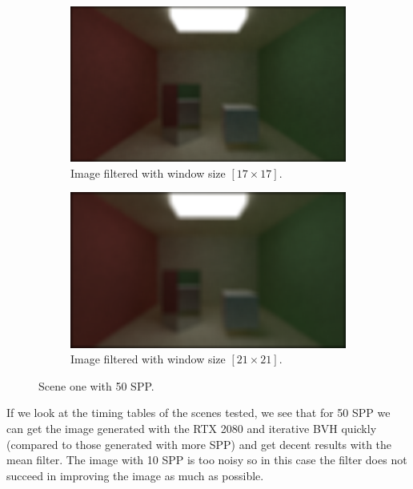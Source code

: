 \documentclass[titlepage,12pt]{report}
\begin{document}
\begin{figure}[H]
	\begin{subfigure}{.48\textwidth}
		\centering
		\includegraphics[scale=0.2]{media/mean/cornell_normal_50_mean_filter_17.png}
		\caption{Image filtered with window size $[17 \times 17]$.}
		\label{mean_filter_7}
	\end{subfigure}
	\begin{subfigure}{.48\textwidth}
		\centering
		\includegraphics[scale=0.2]{media/mean/cornell_normal_50_mean_filter_21.png}
		\caption{Image filtered with window size $[21 \times 21]$.}
		\label{mean_filter_8}
	\end{subfigure}
	\medskip
	\caption{Scene one with 50 SPP.}
	\label{mean_filter_02}
\end{figure}

If we look at the timing tables of the scenes tested, we see that for 50 SPP we can get the image generated with the RTX 2080 and iterative BVH quickly (compared to those generated with more SPP) and get decent results with the mean filter. The image with 10 SPP is too noisy so in this case the filter does not succeed in improving the image as much as possible.
\end{document}
